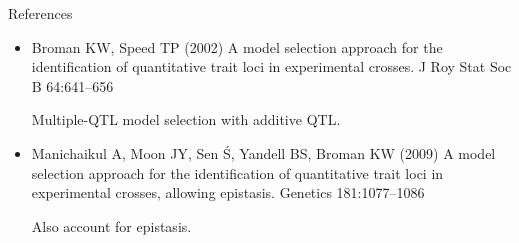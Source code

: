 \documentclass[12pt]{article}
\newcommand{\headsize}{\fontsize{35}{35} \selectfont}
\newcommand{\smallestsize}{\fontsize{18}{22} \selectfont}
\begin{document}
\newpage

\headsize \color{myyellow}
\hfill \begin{minipage}{5.75in}
\centering
References
\end{minipage}

\vspace*{15mm}

\color{mywhite} \smallestsize

\hspace*{0.5in}
\begin{minipage}{9.5in}
\begin{itemize}
\itemsep8pt
\item Broman KW, Speed TP (2002) A model selection approach for the
  identification of quantitative trait loci in experimental crosses. J
  Roy Stat Soc B 64:641--656

{\color{myblue} Multiple-QTL model selection with additive QTL.}

\item Manichaikul A, Moon JY, Sen \'S, Yandell BS, Broman KW (2009) A
  model selection approach for the identification of quantitative
  trait loci in experimental crosses, allowing epistasis. Genetics
  181:1077--1086

{\color{myblue} Also account for epistasis.}

\end{itemize}
\end{minipage}
\end{document}
